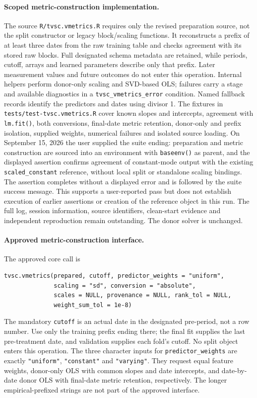 \documentclass[11pt]{article}
\begin{document}
\paragraph{Scoped metric-construction implementation.}
The source \texttt{R/tvsc.vmetrics.R} requires only the revised preparation
source, not the split constructor or legacy block/scaling functions.
It reconstructs a prefix of at least three dates from the raw training
table and checks agreement with its stored raw blocks. Full designated
schema metadata are retained, while periods, cutoff, arrays and learned
parameters describe only that prefix. Later measurement values and future
outcomes do not enter this operation. Internal helpers perform donor-only
scaling and SVD-based OLS; failures carry a stage and available diagnostics
in a \texttt{tvsc\_vmetrics\_error} condition. Named fallback records identify
the predictors and dates using divisor 1. The fixtures in
\texttt{tests/test-tvsc.vmetrics.R} cover known slopes and intercepts,
agreement with \texttt{lm.fit()}, both conversions, final-date metric
retention, donor-only and prefix isolation, supplied weights, numerical
failures and isolated source loading. On September 15, 2026 the user
supplied the suite ending: preparation and metric construction are sourced
into an environment with \texttt{baseenv()} as parent, and the displayed
assertion confirms agreement of constant-mode output with the existing
\texttt{scaled\_constant} reference, without local split or standalone
scaling bindings. The assertion completes without a displayed error and
is followed by the suite success message. This supports a user-reported
pass but does not establish execution of earlier assertions or creation
of the reference object in this run. The full log, session information,
source identifiers, clean-start evidence and independent reproduction
remain outstanding. The donor solver is unchanged.

\paragraph{Approved metric-construction interface.}
The approved core call is
\begin{verbatim}
tvsc.vmetrics(prepared, cutoff, predictor_weights = "uniform",
              scaling = "sd", conversion = "absolute",
              scales = NULL, provenance = NULL, rank_tol = NULL,
              weight_sum_tol = 1e-8)
\end{verbatim}
The mandatory \texttt{cutoff} is an actual date in the designated
pre-period, not a row number. Use only the training prefix ending there;
the final fit supplies the last pre-treatment date, and validation supplies
each fold's cutoff. No split object enters this operation.
The three character inputs for \texttt{predictor\_weights} are exactly
\texttt{"uniform"}, \texttt{"constant"} and \texttt{"varying"}.
They request equal feature weights, donor-only OLS with common slopes and
date intercepts, and date-by-date donor OLS with final-date metric
retention, respectively. The longer empirical-prefixed strings are not
part of the approved interface.
\end{document}
